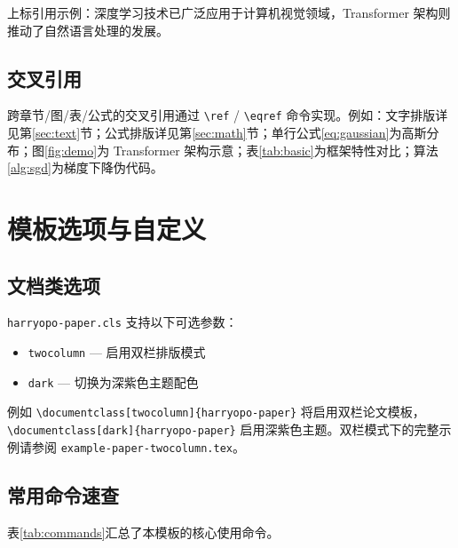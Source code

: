 \documentclass{harryopo-paper}
\begin{document}
上标引用示例：深度学习技术已广泛应用于计算机视觉领域，Transformer 架构则推动了自然语言处理的发展。

\subsection{交叉引用}

跨章节/图/表/公式的交叉引用通过 \verb|\ref| / \verb|\eqref| 命令实现。例如：文字排版详见第\ref{sec:text}节；公式排版详见第\ref{sec:math}节；单行公式\eqref{eq:gaussian}为高斯分布；图\ref{fig:demo}为 Transformer 架构示意；表\ref{tab:basic}为框架特性对比；算法\ref{alg:sgd}为梯度下降伪代码。

\section{模板选项与自定义}
\label{sec:options}

\subsection{文档类选项}

\texttt{harryopo-paper.cls} 支持以下可选参数：

\begin{itemize}
    \item \verb|twocolumn| — 启用双栏排版模式
    \item \verb|dark| — 切换为深紫色主题配色
\end{itemize}

例如 \verb|\documentclass[twocolumn]{harryopo-paper}| 将启用双栏论文模板，\verb|\documentclass[dark]{harryopo-paper}| 启用深紫色主题。双栏模式下的完整示例请参阅 \texttt{example-paper-twocolumn.tex}。

\subsection{常用命令速查}

表\ref{tab:commands}汇总了本模板的核心使用命令。
\end{document}
